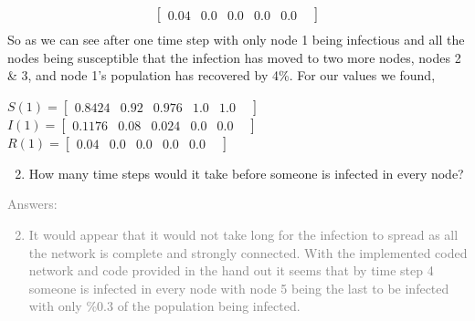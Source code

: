 \documentclass[11pt]{article}
\begin{document}
{\begin{enumerate}
\begin{align*}
\begin{bmatrix}
		0.04    	&
		0.0    	&
		0.0 		&
		0.0 		&
		0.0 		&
		\end{bmatrix}\\
\end{align*}
So as we can see after one time step with only node 1 being infectious and all the nodes being susceptible that the infection has moved to two more nodes, nodes 2 \& 3, and node 1's population has recovered by 4\%. For our values we found,\\
\begin{center}
 	$S(1)=\begin{bmatrix} 
		0.8424    &
		0.92    	&
		0.976 	&
		1.0 		&
		1.0 		&
	\end{bmatrix}$\\
 	$I(1)=\begin{bmatrix} 
		0.1176    	&
		0.08    	&
		0.024	&
		0.0 		&
		0.0 		&
	\end{bmatrix}$\\
 	$R(1)=\begin{bmatrix} 
		0.04  &
		0.0  &
		0.0  &
		0.0  &
		0.0  &
	\end{bmatrix}$\\
\end{center}
\end{enumerate}
}

\begin{enumerate}
	\setcounter{enumi}{1}
	\item How many time steps would it take before someone is infected in every node?
\end{enumerate}
\textcolor{gray}{
Answers:
\begin{enumerate}
	\setcounter{enumi}{1}
	\item It would appear that it would not take long for the infection to spread as all the network is complete and strongly connected. With the implemented coded network and code provided in the hand out it seems that by time step 4 someone is infected in every node with node 5 being the last to be infected with only \%0.3 of the population being infected.   
\end{enumerate}
}
\end{document}
